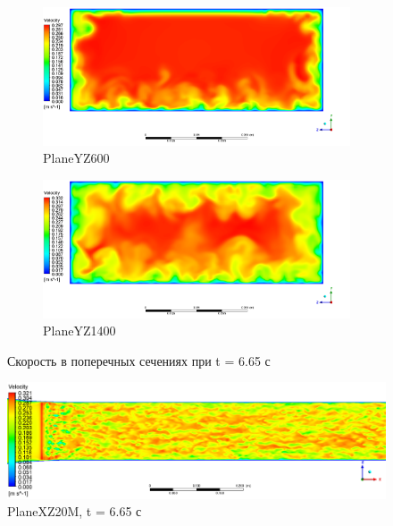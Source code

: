 \begin{figure}[H]
\begin{subfigure}{.5\textwidth}
		\centering
		\includegraphics[width=1.1\linewidth]{../Assets/T665_Velocity_ContourYZ600}
		\caption{PlaneYZ600}
		\label{fig:T665VelocityContourYZ600}
	\end{subfigure}%
	\begin{subfigure}{.5\textwidth}
		\centering
		\includegraphics[width=1.1\linewidth]{../Assets/T665_Velocity_ContourYZ1400}
		\caption{PlaneYZ1400}
		\label{fig:T665VelocityContourYZ1400}
	\end{subfigure}
	\caption{Скорость в поперечных сечениях при t = 6.65 с}
	\label{fig:T665VelocityContourYZ}
\end{figure}
\begin{figure}[H]
	\centering
	\includegraphics[width=1\linewidth]{../Assets/T665_Velocity_ContourXZ20M}
	\caption{PlaneXZ20M, t = 6.65 с}
	\label{fig:t665velocitycontourxz20m}
\end{figure}
